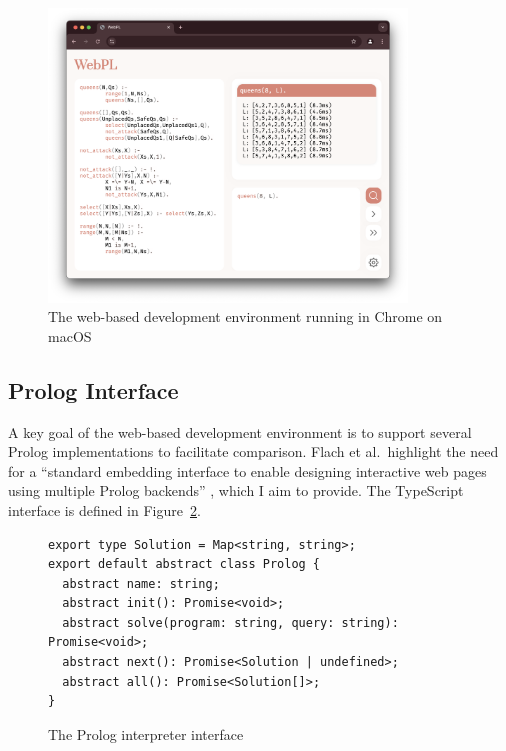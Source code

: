 \begin{figure}[H]
\centering
\includegraphics[width=0.85\textwidth]{07implementation_browser.png}
\caption{The web-based development environment running in Chrome on macOS}
\label{fig:webpl}
\end{figure}

\subsection{Prolog Interface}

\label{sec:prolog-interface}

A key goal of the web-based development environment is to support several Prolog implementations to facilitate comparison. Flach et al.\ highlight the need for a ``standard embedding interface to enable designing interactive web pages using multiple Prolog backends'' \cite{flachSimplyLogicalFirst2023}, which I aim to provide. The TypeScript interface is defined in Figure~\ref{fig:prolog-interface}.

\begin{figure}[H]
\centering
\begin{verbatim}
export type Solution = Map<string, string>;
export default abstract class Prolog {
  abstract name: string;
  abstract init(): Promise<void>;
  abstract solve(program: string, query: string): Promise<void>;
  abstract next(): Promise<Solution | undefined>;
  abstract all(): Promise<Solution[]>;
}
\end{verbatim}
\caption{The Prolog interpreter interface}
\label{fig:prolog-interface}
\end{figure}

\vspace*{-1.5em}

